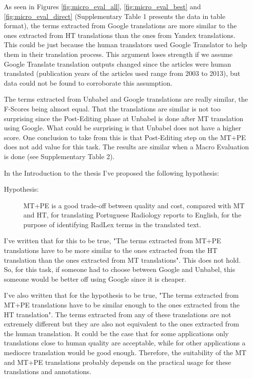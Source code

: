 As seen in Figures \ref{fig:micro_eval_all}, \ref{fig:micro_eval_best} and \ref{fig:micro_eval_direct} (Supplementary Table 1 presents the data in table format), the terms extracted from Google translations are more similar to the ones extracted from HT translations than the ones from Yandex translations. This could be just because the human translators used Google Translator to help them in their translation process. This argument loses strength if we assume Google Translate translation outputs changed since the articles were human translated (publication years of the articles used range from 2003 to 2013), but data could not be found to corroborate this assumption. 

The terms extracted from Unbabel and Google translations are really similar, the F-Scores being almost equal. That the translations are similar is not too surprising since the Post-Editing phase at Unbabel is done after MT translation using Google. What could be surprising is that Unbabel does not have a higher score. One conclusion to take from this is that Post-Editing step on the MT+PE does not add value for this task. The results are similar when a Macro Evaluation is done (see Supplementary Table 2).

In the Introduction to the thesis I've proposed the following hypothesis:

\begin{description}
	\item[Hypothesis:] MT+PE is a good trade-off between quality and cost, compared with MT and HT, for translating Portuguese Radiology reports to English, for the purpose of identifying RadLex terms in the translated text. 
\end{description}

I've written that for this to be true, "The terms extracted from MT+PE translations have to be more similar to the ones extracted from the HT translation than the ones extracted from MT translations". This does not hold. So, for this task, if someone had to choose between Google and Unbabel, this someone would be better off using Google since it is cheaper. 

I've also written that for the hypothesis to be true, "The terms extracted from MT+PE translations have to be similar enough to the ones extracted from the HT translation". The terms extracted from any of these translations are not extremely different but they are also not equivalent to the ones extracted from the human translation. It could be the case that for some applications only translations close to human quality are acceptable, while for other applications a mediocre translation would be good enough. Therefore, the suitability of the MT and MT+PE translations probably depends on the practical usage for these translations and annotations. 

